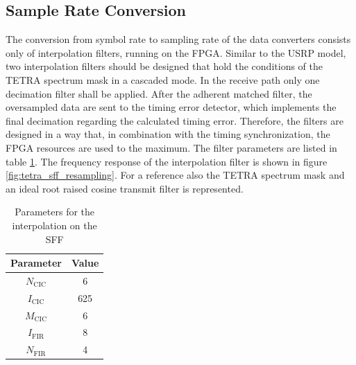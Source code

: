 \subsection{Sample Rate Conversion}
The conversion from symbol rate to sampling rate of the data converters consists only of interpolation filters, running on the FPGA. Similar to the USRP model, two interpolation filters should be designed that hold the conditions of the TETRA spectrum mask in a cascaded mode. In the receive path only one decimation filter shall be applied. After the adherent matched filter, the oversampled data are sent to the timing error detector, which implements the final decimation regarding the calculated timing error. Therefore, the filters are designed in a way that, in combination with the timing synchronization, the FPGA resources are used to the maximum.
The filter parameters are listed in table \ref{tab:sff_res_par}. The frequency response of the interpolation filter is shown in figure \ref{fig:tetra_sff_resampling}. For a reference also the TETRA spectrum mask and an ideal root raised cosine transmit filter is represented.

\begin{table}[htb]
	\centering
		\begin{tabular}{c|c}
		\toprule
		Parameter & Value \\
		\midrule
		$N_\text{CIC}$  & 6 \\
		$I_\text{CIC}$  & 625 \\
		$M_\text{CIC}$  & 6 \\
		$I_\text{FIR}$  & 8 \\
		$N_\text{FIR}$  & 4 \\
		\bottomrule
		\end{tabular}
	\caption{Parameters for the interpolation on the SFF}
	\label{tab:sff_res_par}
\end{table}

